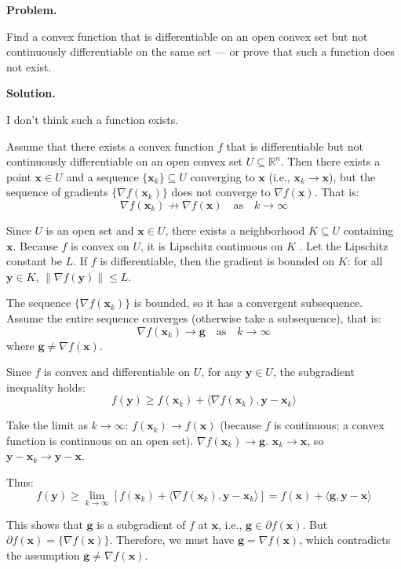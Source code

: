 \documentclass[12pt, a4paper, oneside]{ctexart}
\newcounter{problemname}
\newenvironment{problem}{\begin{shaded}\stepcounter{problemname}\par\noindent\textbf{Problem\arabic{problemname}. }}{\end{shaded}\par}
\newenvironment{solution}{\par\noindent\textbf{Solution. }}{\par}
\begin{document}
 
\begin{problem}
 	
\noindent Find a convex function that is differentiable on an open convex set but not continuously differentiable on the same set — or prove that such a function does not exist.
 	
\end{problem}
 
\begin{solution}
 
I don't think such a function exists.

Assume that there exists a convex function $ f $ that is differentiable but not continuously differentiable on an open convex set $ U \subseteq \mathbb{R}^n $. Then there exists a point $ \mathbf{x} \in U $ and a sequence $ \{\mathbf{x}_k\} \subseteq U $ converging to $ \mathbf{x} $ (i.e., $ \mathbf{x}_k \to \mathbf{x} $), but the sequence of gradients $ \{\nabla f(\mathbf{x}_k)\} $ does not converge to $ \nabla f(\mathbf{x}) $. That is:
$$
\nabla f(\mathbf{x}_k) \nrightarrow \nabla f(\mathbf{x}) \quad \text{as} \quad k \to \infty
$$

Since $ U $ is an open set and $ \mathbf{x} \in U $, there exists a neighborhood $ K \subseteq U $ containing $ \mathbf{x} $. Because $ f $ is convex on $ U $, it is Lipschitz continuous on $ K $ . Let the Lipschitz constant be $ L $. If $ f $ is differentiable, then the gradient is bounded on $ K $: for all $ \mathbf{y} \in K $, $ \|\nabla f(\mathbf{y})\| \leq L $.

The sequence $ \{\nabla f(\mathbf{x}_k)\} $ is bounded, so it has a convergent subsequence. Assume the entire sequence converges (otherwise take a subsequence), that is:
$$
\nabla f(\mathbf{x}_k) \to \mathbf{g} \quad \text{as} \quad k \to \infty
$$
where $ \mathbf{g} \neq \nabla f(\mathbf{x}) $.

Since $ f $ is convex and differentiable on $ U $, for any $ \mathbf{y} \in U $, the subgradient inequality holds:
$$
f(\mathbf{y}) \geq f(\mathbf{x}_k) + \langle \nabla f(\mathbf{x}_k), \mathbf{y} - \mathbf{x}_k \rangle
$$

Take the limit as $ k \to \infty $:
$ f(\mathbf{x}_k) \to f(\mathbf{x}) $ (because $ f $ is continuous; a convex function is continuous on an open set).
$ \nabla f(\mathbf{x}_k) \to \mathbf{g} $.
$ \mathbf{x}_k \to \mathbf{x} $, so $ \mathbf{y} - \mathbf{x}_k \to \mathbf{y} - \mathbf{x}$.

Thus:
$$
f(\mathbf{y}) \geq \lim_{k \to \infty} \left[ f(\mathbf{x}_k) + \langle \nabla f(\mathbf{x}_k), \mathbf{y} - \mathbf{x}_k \rangle \right] = f(\mathbf{x}) + \langle \mathbf{g}, \mathbf{y} - \mathbf{x} \rangle
$$

This shows that $ \mathbf{g} $ is a subgradient of $ f $ at $ \mathbf{x} $, i.e., $ \mathbf{g} \in \partial f(\mathbf{x}) $. But  $ \partial f(\mathbf{x}) = \{\nabla f(\mathbf{x})\} $. Therefore, we must have $ \mathbf{g} = \nabla f(\mathbf{x}) $, which contradicts the assumption $ \mathbf{g} \neq \nabla f(\mathbf{x}) $.
 
\end{solution}
\end{document}
